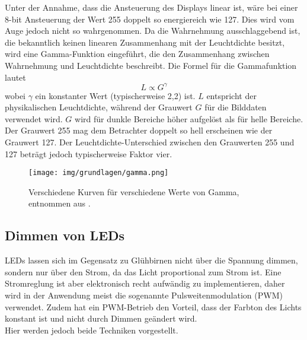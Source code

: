 Unter der Annahme, dass die Ansteuerung des Displays linear ist, wäre bei einer 8-bit Ansteuerung der Wert 255 doppelt so energiereich wie 127. Dies wird vom Auge jedoch nicht so wahrgenommen. Da die Wahrnehmung ausschlaggebend ist, die bekanntlich keinen linearen Zusammenhang mit der Leuchtdichte besitzt, wird eine Gamma-Funktion eingeführt, die den Zusammenhang zwischen Wahrnehmung und Leuchtdichte beschreibt. Die Formel für die Gammafunktion lautet
\begin{equation}
L \propto G^\gamma
\end{equation}
wobei $ \gamma $ ein konstanter Wert (typischerweise 2,2) ist. $ L $ entspricht der physikalischen Leuchtdichte, während der Grauwert $ G $ für die Bilddaten verwendet wird. $ G $ wird für dunkle Bereiche höher aufgelöst als für helle Bereiche. Der Grauwert 255 mag dem Betrachter doppelt so hell erscheinen wie der
Grauwert 127. Der Leuchtdichte-Unterschied zwischen den Grauwerten 255 und 127 beträgt jedoch typischerweise Faktor vier.




\begin{figure}[H]
	\centering
	\texttt{[image: img/grundlagen/gamma.png]}
	\caption{Verschiedene Kurven für verschiedene Werte von Gamma, entnommen aus \cite{gamma_IMG}.}
	\label{fig:gamma}
\end{figure}

\subsection{Dimmen von LEDs}
LEDs lassen sich im Gegensatz zu Glühbirnen nicht über die Spannung dimmen, sondern nur über den Strom, da das Licht proportional zum Strom ist. Eine Stromreglung ist aber elektronisch recht aufwändig zu implementieren, daher wird in der Anwendung meist die sogenannte Pulsweitenmodulation (PWM) verwendet. Zudem hat ein PWM-Betrieb den Vorteil, dass der Farbton des Lichts konstant ist und nicht durch Dimmen geändert wird. \\
Hier werden jedoch beide Techniken vorgestellt.


